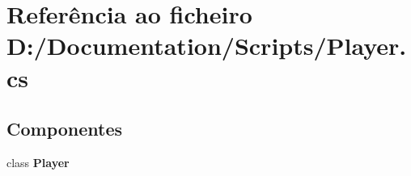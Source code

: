 \section{Referência ao ficheiro D\+:/\+Documentation/\+Scripts/\+Player.cs}
\label{_player_8cs}
\subsection*{Componentes}
\begin{DoxyCompactItemize}
\item 
class \textbf{ Player}
\end{DoxyCompactItemize}
